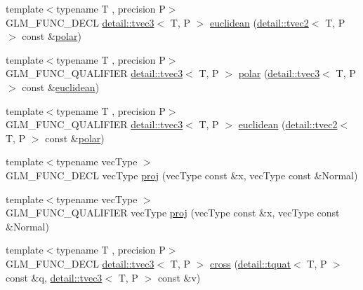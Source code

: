 \begin{DoxyCompactItemize}
\item 
{\footnotesize template$<$typename T , precision P$>$ }\\G\+L\+M\+\_\+\+F\+U\+N\+C\+\_\+\+D\+E\+CL \hyperlink{structglm_1_1detail_1_1tvec3}{detail\+::tvec3}$<$ T, P $>$ \hyperlink{group__gtx__polar__coordinates_ga221eaf671619626425e9fb5cb69400b0}{euclidean} (\hyperlink{structglm_1_1detail_1_1tvec2}{detail\+::tvec2}$<$ T, P $>$ const \&\hyperlink{group__gtx__polar__coordinates_ga7d0a4068875efec56e5d2c6451b5bde2}{polar})
\item 
{\footnotesize template$<$typename T , precision P$>$ }\\G\+L\+M\+\_\+\+F\+U\+N\+C\+\_\+\+Q\+U\+A\+L\+I\+F\+I\+ER \hyperlink{structglm_1_1detail_1_1tvec3}{detail\+::tvec3}$<$ T, P $>$ \hyperlink{group__gtx__polar__coordinates_ga7d0a4068875efec56e5d2c6451b5bde2}{polar} (\hyperlink{structglm_1_1detail_1_1tvec3}{detail\+::tvec3}$<$ T, P $>$ const \&\hyperlink{group__gtx__polar__coordinates_ga221eaf671619626425e9fb5cb69400b0}{euclidean})
\item 
{\footnotesize template$<$typename T , precision P$>$ }\\G\+L\+M\+\_\+\+F\+U\+N\+C\+\_\+\+Q\+U\+A\+L\+I\+F\+I\+ER \hyperlink{structglm_1_1detail_1_1tvec3}{detail\+::tvec3}$<$ T, P $>$ \hyperlink{group__gtx__polar__coordinates_ga221eaf671619626425e9fb5cb69400b0}{euclidean} (\hyperlink{structglm_1_1detail_1_1tvec2}{detail\+::tvec2}$<$ T, P $>$ const \&\hyperlink{group__gtx__polar__coordinates_ga7d0a4068875efec56e5d2c6451b5bde2}{polar})
\item 
{\footnotesize template$<$typename vec\+Type $>$ }\\G\+L\+M\+\_\+\+F\+U\+N\+C\+\_\+\+D\+E\+CL vec\+Type \hyperlink{group__gtx__projection_gadf29123bcf748fc9d6fb0998192184cf}{proj} (vec\+Type const \&x, vec\+Type const \&Normal)
\item 
{\footnotesize template$<$typename vec\+Type $>$ }\\G\+L\+M\+\_\+\+F\+U\+N\+C\+\_\+\+Q\+U\+A\+L\+I\+F\+I\+ER vec\+Type \hyperlink{group__gtx__projection_gadf29123bcf748fc9d6fb0998192184cf}{proj} (vec\+Type const \&x, vec\+Type const \&Normal)
\item 
{\footnotesize template$<$typename T , precision P$>$ }\\G\+L\+M\+\_\+\+F\+U\+N\+C\+\_\+\+D\+E\+CL \hyperlink{structglm_1_1detail_1_1tvec3}{detail\+::tvec3}$<$ T, P $>$ \hyperlink{group__gtx__quaternion_ga8b5c3ff869c773f26d0a562dfcd3f9e4}{cross} (\hyperlink{structglm_1_1detail_1_1tquat}{detail\+::tquat}$<$ T, P $>$ const \&q, \hyperlink{structglm_1_1detail_1_1tvec3}{detail\+::tvec3}$<$ T, P $>$ const \&v)

\end{DoxyCompactItemize}
